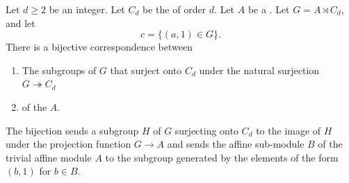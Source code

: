 \begin{proposition} \label{proposition:subgroups_of_semidirect_product_of_an_abelian_group_with_cyclic_group_surjecting_to_cyclic_part}

    Let $d \geq 2$ be an integer. Let $C_d$ be the  of order $d$. Let $A$ be a . Let $G = A \rtimes C_d$, and let
    $$c = \{(a,1) \in G\}.$$
    There is a bijective correspondence between
    \begin{enumerate}
        \item The subgroups of $G$ that surject onto $C_d$ under the natural surjection $G \twoheadrightarrow C_d$
        \item {} of the  $A$.
    \end{enumerate}
    The bijection sends a subgroup $H$ of $G$ surjecting onto $C_d$ to the image of $H$ under the projection function $G \to A$ and sends the affine sub-module $B$ of the trivial affine module $A$ to the subgroup generated by the elements of the form $(b, 1)$ for $b \in B$. 
    
\end{proposition}